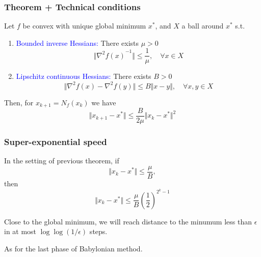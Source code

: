 \documentclass{beamer}
\begin{document}
\begin{frame}
  \frametitle{Theorem + Technical conditions }
  \begin{theorem}
    Let $f$ be convex with unique global minimum $x^*$, and $X$ a ball around $x^*$ s.t.
    \begin{enumerate}
      \item \textcolor{blue}{Bounded inverse Hessians:} There exists $\mu > 0$
            \begin{equation}
              \Vert {\nabla^2 f(x)}^{-1} \Vert \le \frac{1}{\mu}, \quad \forall x \in X
            \end{equation}
      \item \textcolor{blue}{Lipschitz continuous Hessians:} There exists $B>0$
            \begin{equation}
              \Vert \nabla^2 f(x) - \nabla^2 f(y) \Vert \le B \Vert x-y \Vert, \quad \forall x,y \in X
            \end{equation}
    \end{enumerate}
    Then, for $x_{k+1} = N_f(x_k)$ we have
    \begin{equation}
      \Vert x_{k+1} -x^* \Vert \le \frac{B}{2 \mu} \Vert x_k - x^* \Vert^2
    \end{equation}
  \end{theorem}
\end{frame}


\begin{frame}
  \frametitle{Super-exponential speed}
  \begin{corollary}%
    In the setting of previous theorem, if
    \begin{equation}
      \Vert x_k - x^* \Vert \le \frac{\mu}{B},
    \end{equation}
    then
    \begin{equation}
      \Vert x_k -x^*  \Vert \le \frac{\mu}{B} {\left( \frac{1}{2} \right)}^{2^k-1}
    \end{equation}
  \end{corollary}
  Close to the global minimum, we will reach distance to the minumum less than $\epsilon$ in at most $\log \log (1/\epsilon)$ steps.

  As for the last phase of Babylonian method.
\end{frame}
\end{document}
